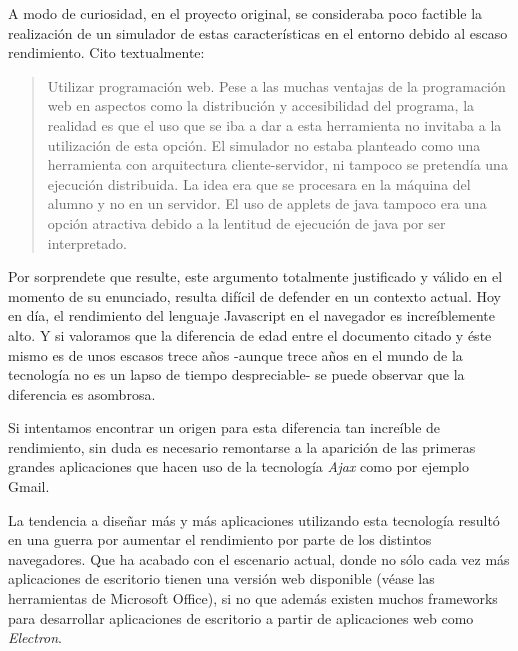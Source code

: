 A modo de curiosidad, en el proyecto original, se consideraba poco factible la realización de 
un simulador de estas características en el entorno debido al escaso rendimiento. Cito textualmente:

\begin{quotation}
Utilizar programación web. Pese a las muchas ventajas de la programación
web en aspectos como la distribución y accesibilidad del programa, la realidad
es que el uso que se iba a dar a esta herramienta no invitaba a la utilización de
esta opción. El simulador no estaba planteado como una herramienta con
arquitectura cliente-servidor, ni tampoco se pretendía una ejecución distribuida.
La idea era que se procesara en la máquina del alumno y no en un servidor. El
uso de applets de java tampoco era una opción atractiva debido a la lentitud de
ejecución de java por ser interpretado.
\end{quotation} \cite{SIMDE}

\bigskip
Por sorprendete que resulte, este argumento totalmente justificado y válido en el momento
de su enunciado, resulta difícil de defender en un contexto actual. Hoy en día,
el rendimiento del lenguaje Javascript en el navegador es increíblemente alto. Y si valoramos que 
la diferencia de edad entre el documento citado y éste mismo es de unos escasos trece años -aunque 
trece años en el mundo de la tecnología no es un lapso de tiempo despreciable- se puede observar
que la diferencia es asombrosa.
 
\bigskip
Si intentamos encontrar un origen para esta diferencia tan increíble de rendimiento, sin duda
es necesario remontarse a la aparición de las primeras grandes aplicaciones que hacen uso de la tecnología
\textit{Ajax} como por ejemplo Gmail.\cite{EvolutionJavascript}

\bigskip
La tendencia a diseñar más y más aplicaciones utilizando esta tecnología resultó en una guerra por aumentar el rendimiento por parte de los distintos navegadores. Que ha 
acabado con el escenario actual, donde no sólo cada vez más aplicaciones de escritorio tienen una versión web 
disponible (véase las herramientas de Microsoft Office), si no que además existen muchos frameworks para 
desarrollar aplicaciones de escritorio a partir de aplicaciones web como \textit{Electron}.\cite{Electron}

